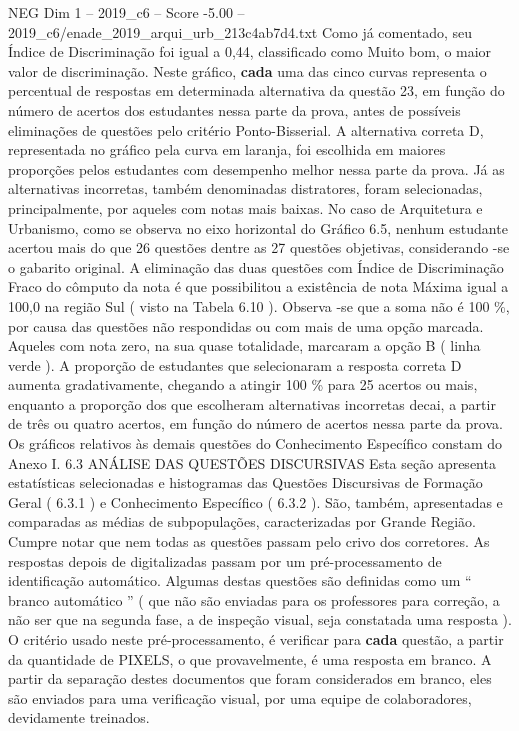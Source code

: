 \begin{textsample}{NEG Dim 1 – 2019\_c6 – Score -5.00 – 2019\_c6/enade\_2019\_arqui\_urb\_213c4ab7d4.txt}
Como já comentado, seu Índice de Discriminação foi igual a 0,44, classificado como Muito bom, o maior valor de discriminação.
Neste gráfico, \textbf{cada} uma das cinco curvas representa o percentual de respostas em determinada alternativa da questão 23, em função do número de acertos dos estudantes nessa parte da prova, antes de possíveis eliminações de questões pelo critério Ponto-Bisserial.
A alternativa correta D, representada no gráfico pela curva em laranja, foi escolhida em maiores proporções pelos estudantes com desempenho melhor nessa parte da prova.
Já as alternativas incorretas, também denominadas distratores, foram selecionadas, principalmente, por aqueles com notas mais baixas.
No caso de Arquitetura e Urbanismo, como se observa no eixo horizontal do Gráfico 6.5, nenhum estudante acertou mais do que 26 questões dentre as 27 questões objetivas, considerando -se o gabarito original.
A eliminação das duas questões com Índice de Discriminação Fraco do cômputo da nota é que possibilitou a existência de nota Máxima igual a 100,0 na região Sul ( visto na Tabela 6.10 ).
Observa -se que a soma não é 100 \%, por causa das questões não respondidas ou com mais de uma opção marcada.
Aqueles com nota zero, na sua quase totalidade, marcaram a opção B ( linha verde ).
A proporção de estudantes que selecionaram a resposta correta D aumenta gradativamente, chegando a atingir 100 \% para 25 acertos ou mais, enquanto a proporção dos que escolheram alternativas incorretas decai, a partir de três ou quatro acertos, em função do número de acertos nessa parte da prova.
Os gráficos relativos às demais questões do Conhecimento Específico constam do Anexo I. 6.3 ANÁLISE DAS QUESTÕES DISCURSIVAS Esta seção apresenta estatísticas selecionadas e histogramas das Questões Discursivas de Formação Geral ( 6.3.1 ) e Conhecimento Específico ( 6.3.2 ).
São, também, apresentadas e comparadas as médias de subpopulações, caracterizadas por Grande Região.
Cumpre notar que nem todas as questões passam pelo crivo dos corretores.
As respostas depois de digitalizadas passam por um pré-processamento de identificação automático.
Algumas destas questões são definidas como um “ branco automático ” ( que não são enviadas para os professores para correção, a não ser que na segunda fase, a de inspeção visual, seja constatada uma resposta ).
O critério usado neste pré-processamento, é verificar para \textbf{cada} questão, a partir da quantidade de PIXELS, o que provavelmente, é uma resposta em branco.
A partir da separação destes documentos que foram considerados em branco, eles são enviados para uma verificação visual, por uma equipe de colaboradores, devidamente treinados.

\end{textsample}
